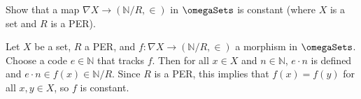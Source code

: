 \begin{exercise}
Show that a map \(\nabla X \to (\mathbb{N} / R, \in)\) in \(\omegaSets\) is constant (where \(X\) is a set and \(R\) is a PER).
\end{exercise}

\begin{solution}
Let \(X\) be a set, \(R\) a PER, and \(f : \nabla X \to (\mathbb{N} / R, \in)\) a morphism in \(\omegaSets\).
Choose a code \(e \in \mathbb{N}\) that tracks \(f\).
Then for all \(x \in X\) and \(n \in \mathbb{N}\), \(e \cdot n\) is defined and \(e \cdot n \in f(x) \in \mathbb{N} / R\). Since \(R\) is a PER, this implies that \(f(x) = f(y)\) for all \(x, y \in X\), so \(f\) is constant.
\end{solution}